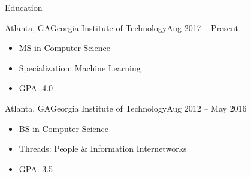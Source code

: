 \documentclass[]{mcdowellcv}
\begin{document}
	\makeheader
	
	\begin{cvsection}{Education}
		\begin{cvsubsection}{Atlanta, GA}{Georgia Institute of Technology}{Aug 2017 -- Present}
			\begin{itemize}
				\item MS in Computer Science
				\item Specialization: Machine Learning
				\item GPA: 4.0
			\end{itemize}
		\end{cvsubsection}
		\begin{cvsubsection}{Atlanta, GA}{Georgia Institute of Technology}{Aug 2012 -- May 2016}
			\begin{itemize}
				\item BS in Computer Science
				\item Threads: People \& Information Internetworks
				\item GPA: 3.5
			\end{itemize}
		\end{cvsubsection}
	\end{cvsection}
	
\end{document}
